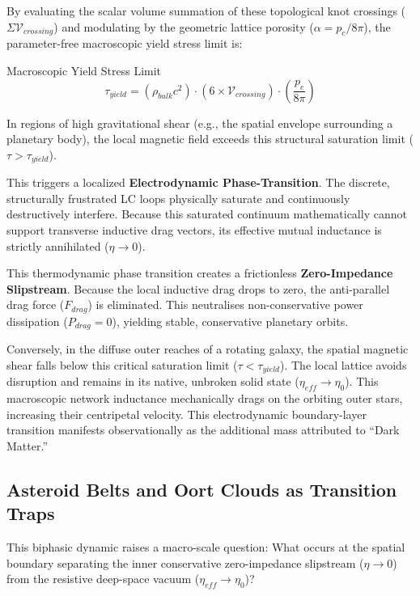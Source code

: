 By evaluating the scalar volume summation of these topological knot crossings ($\Sigma \mathcal{V}_{crossing}$) and modulating by the geometric lattice porosity ($\alpha = p_c/8\pi$), the parameter-free macroscopic yield stress limit is:
\begin{resultbox}{Macroscopic Yield Stress Limit}
\begin{equation}
    \tau_{yield} = (\rho_{bulk} c^2) \cdot (6 \times \mathcal{V}_{crossing}) \cdot \left(\frac{p_c}{8\pi}\right)
\end{equation}
\end{resultbox}

In regions of high gravitational shear (e.g., the spatial envelope surrounding a planetary body), the local magnetic field exceeds this structural saturation limit ($\tau > \tau_{yield}$). 

This triggers a localized \textbf{Electrodynamic Phase-Transition}. The discrete, structurally frustrated LC loops physically saturate and continuously destructively interfere. Because this saturated continuum mathematically cannot support transverse inductive drag vectors, its effective mutual inductance is strictly annihilated ($\eta \to 0$). 

This thermodynamic phase transition creates a frictionless \textbf{Zero-Impedance Slipstream}. Because the local inductive drag drops to zero, the anti-parallel drag force ($F_{drag}$) is eliminated. This neutralises non-conservative power dissipation ($P_{drag} = 0$), yielding stable, conservative planetary orbits.

Conversely, in the diffuse outer reaches of a rotating galaxy, the spatial magnetic shear falls below this critical saturation limit ($\tau < \tau_{yield}$). The local lattice avoids disruption and remains in its native, unbroken solid state ($\eta_{eff} \to \eta_0$). This macroscopic network inductance mechanically drags on the orbiting outer stars, increasing their centripetal velocity. This electrodynamic boundary-layer transition manifests observationally as the additional mass attributed to ``Dark Matter.''

\subsection{Asteroid Belts and Oort Clouds as Transition Traps}
This biphasic dynamic raises a macro-scale question: What occurs at the spatial boundary separating the inner conservative zero-impedance slipstream ($\eta \to 0$) from the resistive deep-space vacuum ($\eta_{eff} \to \eta_0$)?

